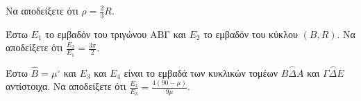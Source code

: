 \begin{alist}
\item Να αποδείξετε ότι $\rho = \frac{2}{3}R$. 
\item Έστω $E_1$ το εμβαδόν του τριγώνου ΑΒΓ και $E_2$ το εμβαδόν του κύκλου $(Β, R)$. Να αποδείξετε ότι $\frac{E_2}{E_1} = \frac{3\pi}{2}$. 
\item Έστω $\hat{Β} = \mu^\circ$ και $E_3$ και $E_4$ είναι το εμβαδά των κυκλικών τομέων $\overset{\frown}{ΒΔΑ}$ και $\overset{\frown}{ΓΔΕ}$ αντίστοιχα. Να αποδείξετε ότι $\frac{E_4}{E_3} = \frac{4(90-\mu)}{9\mu}$. 
\end{alist}